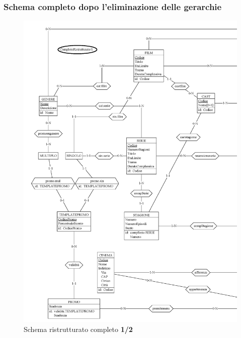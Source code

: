 \documentclass[a4paper,12pt]{report}
\begin{document}
\subsubsection{Schema completo dopo l'eliminazione delle gerarchie}
\begin{figure}[H]
	\centering
	\includegraphics[width=450pt]{ER/ristrutturazione/ristcomp1.png}
	\caption{Schema ristrutturato completo \textbf{1/2}}
\end{figure}
\end{document}
